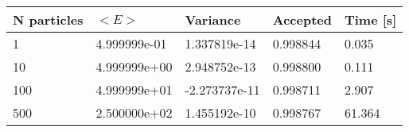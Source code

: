 \begin{table}[h!]
\centering 
\begin{tabular}{|l|l|l|l|l|}
\hline 
N particles & $<E>$ & Variance & Accepted & Time [s]\\ 
 \hline 
1 & 4.999999e-01 & 1.337819e-14 & 0.998844 & 0.035 \\ \hline 
10 & 4.999999e+00 & 2.948752e-13 & 0.998800 & 0.111 \\ \hline 
100 & 4.999999e+01 & -2.273737e-11 & 0.998711 & 2.907 \\ \hline 
500 & 2.500000e+02 & 1.455192e-10 & 0.998767 & 61.364 \\ \hline 
\end{tabular}
\label{tab:in1} 
\end{table} 
